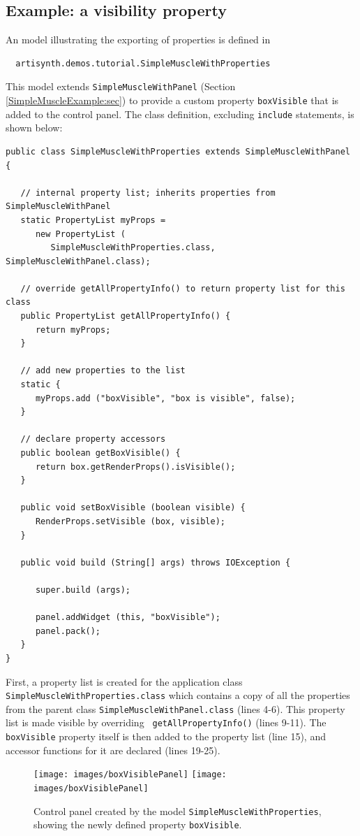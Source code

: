 \subsection{Example: a visibility property}
%
An model illustrating the exporting of properties is defined in
%
\begin{verbatim}
  artisynth.demos.tutorial.SimpleMuscleWithProperties
\end{verbatim}
%
This model extends {\tt SimpleMuscleWithPanel} (Section
\ref{SimpleMuscleExample:sec}) to provide a custom property
{\tt boxVisible} that is added to the control panel.
The class definition, excluding {\tt include} statements,
is shown below:
%
\lstset{numbers=left}
\begin{lstlisting}[]
public class SimpleMuscleWithProperties extends SimpleMuscleWithPanel {

   // internal property list; inherits properties from SimpleMuscleWithPanel
   static PropertyList myProps =
      new PropertyList (
         SimpleMuscleWithProperties.class, SimpleMuscleWithPanel.class);

   // override getAllPropertyInfo() to return property list for this class
   public PropertyList getAllPropertyInfo() {
      return myProps;
   }

   // add new properties to the list
   static {
      myProps.add ("boxVisible", "box is visible", false);
   }

   // declare property accessors
   public boolean getBoxVisible() {
      return box.getRenderProps().isVisible();
   }

   public void setBoxVisible (boolean visible) {
      RenderProps.setVisible (box, visible);
   }

   public void build (String[] args) throws IOException {

      super.build (args);

      panel.addWidget (this, "boxVisible");
      panel.pack();
   }
}
\end{lstlisting}
\lstset{numbers=none}
%
First, a property list is created for the application class {\tt
SimpleMuscleWithProperties.class} which contains a copy of all the
properties from the parent class {\tt SimpleMuscleWithPanel.class}
(lines 4-6). This property list is made visible by overriding {\tt
getAllPropertyInfo()} (lines 9-11). The {\tt boxVisible} property
itself is then added to the property list (line 15), and accessor
functions for it are declared (lines 19-25).

\begin{figure}[t]
\begin{center}
\iflatexml
 \texttt{[image: images/boxVisiblePanel]}
\else
 \texttt{[image: images/boxVisiblePanel]}
\fi
\end{center}
\caption{Control panel created by the model {\tt SimpleMuscleWithProperties},
showing the newly defined property {\tt boxVisible}.}
\label{boxVisiblePanel:fig}
\end{figure}

